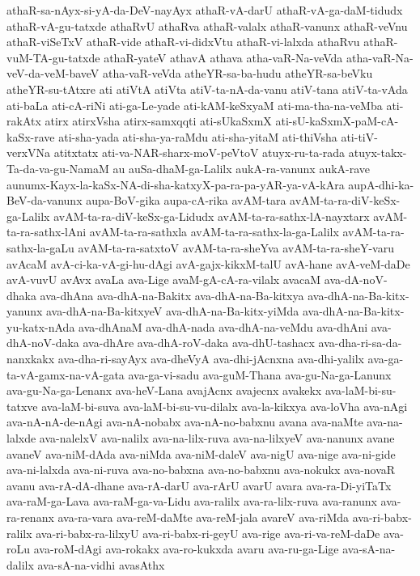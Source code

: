 {athaR-sa-nAyx-si-yA-da-DeV-nayAyx
athaR-vA-darU
athaR-vA-ga-daM-tidudx
athaR-vA-gu-tatxde
athaRvU
athaRva
athaR-valalx
athaR-vanunx
athaR-veVnu
athaR-viSeTxV
athaR-vide
athaR-vi-didxVtu
athaR-vi-lalxda
athaRvu
athaR-vuM-TA-gu-tatxde
athaR-yateV
athavA
athava
atha-vaR-Na-veVda
atha-vaR-Na-veV-da-veM-baveV
atha-vaR-veVda
atheYR-sa-ba-hudu
atheYR-sa-beVku
atheYR-su-tAtxre
ati
atiVtA
atiVta
atiV-ta-nA-da-vanu
atiV-tana
atiV-ta-vAda
ati-baLa
ati-cA-riNi
ati-ga-Le-yade
ati-kAM-keSxyaM
ati-ma-tha-na-veMba
ati-rakAtx
atirx
atirxVsha
atirx-samxqqti
ati-sUkaSxmX
ati-sU-kaSxmX-paM-cA-kaSx-rave
ati-sha-yada
ati-sha-ya-raMdu
ati-sha-yitaM
ati-thiVsha
ati-tiV-verxVNa
atitxtatx
ati-va-NAR-sharx-moV-peVtoV
atuyx-ru-ta-rada
atuyx-takx-Ta-da-va-gu-NamaM
au
auSa-dhaM-ga-Lalilx
aukA-ra-vanunx
aukA-rave
aunumx-Kayx-la-kaSx-NA-di-sha-katxyX-pa-ra-pa-yAR-ya-vA-kAra
aupA-dhi-ka-BeV-da-vanunx
aupa-BoV-gika
aupa-cA-rika
avAM-tara
avAM-ta-ra-diV-keSx-ga-Lalilx
avAM-ta-ra-diV-keSx-ga-Lidudx
avAM-ta-ra-sathx-lA-nayxtarx
avAM-ta-ra-sathx-lAni
avAM-ta-ra-sathxla
avAM-ta-ra-sathx-la-ga-Lalilx
avAM-ta-ra-sathx-la-gaLu
avAM-ta-ra-satxtoV
avAM-ta-ra-sheYva
avAM-ta-ra-sheY-varu
avAcaM
avA-ci-ka-vA-gi-hu-dAgi
avA-gajx-kikxM-talU
avA-hane
avA-veM-daDe
avA-vuvU
avAvx
avaLa
ava-Lige
avaM-gA-cA-ra-vilalx
avacaM
ava-dA-noV-dhaka
ava-dhAna
ava-dhA-na-Bakitx
ava-dhA-na-Ba-kitxya
ava-dhA-na-Ba-kitx-yanunx
ava-dhA-na-Ba-kitxyeV
ava-dhA-na-Ba-kitx-yiMda
ava-dhA-na-Ba-kitx-yu-katx-nAda
ava-dhAnaM
ava-dhA-nada
ava-dhA-na-veMdu
ava-dhAni
ava-dhA-noV-daka
ava-dhAre
ava-dhA-roV-daka
ava-dhU-tashacx
ava-dha-ri-sa-da-nanxkakx
ava-dha-ri-sayAyx
ava-dheVyA
ava-dhi-jAcnxna
ava-dhi-yalilx
ava-ga-ta-vA-gamx-na-vA-gata
ava-ga-vi-sadu
ava-guM-Thana
ava-gu-Na-ga-Lanunx
ava-gu-Na-ga-Lenanx
ava-heV-Lana
avajAcnx
avajecnx
avakekx
ava-laM-bi-su-tatxve
ava-laM-bi-suva
ava-laM-bi-su-vu-dilalx
ava-la-kikxya
ava-loVha
ava-nAgi
ava-nA-nA-de-nAgi
ava-nA-nobabx
ava-nA-no-babxnu
avana
ava-naMte
ava-na-lalxde
ava-nalelxV
ava-nalilx
ava-na-lilx-ruva
ava-na-lilxyeV
ava-nanunx
avane
avaneV
ava-niM-dAda
ava-niMda
ava-niM-daleV
ava-nigU
ava-nige
ava-ni-gide
ava-ni-lalxda
ava-ni-ruva
ava-no-babxna
ava-no-babxnu
ava-nokukx
ava-novaR
avanu
ava-rA-dA-dhane
ava-rA-darU
ava-rArU
avarU
avara
ava-ra-Di-yiTaTx
ava-raM-ga-Lava
ava-raM-ga-va-Lidu
ava-ralilx
ava-ra-lilx-ruva
ava-ranunx
ava-ra-renanx
ava-ra-vara
ava-reM-daMte
ava-reM-jala
avareV
ava-riMda
ava-ri-babx-ralilx
ava-ri-babx-ra-lilxyU
ava-ri-babx-ri-geyU
ava-rige
ava-ri-va-reM-daDe
ava-roLu
ava-roM-dAgi
ava-rokakx
ava-ro-kukxda
avaru
ava-ru-ga-Lige
ava-sA-na-dalilx
ava-sA-na-vidhi
avasAthx
}
